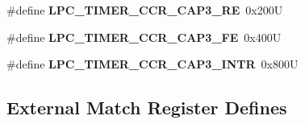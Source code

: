 \begin{DoxyCompactItemize}
\mbox{\label{group__lpc__timer_ga5c44672467e4e8e48691c2017b613d95}} 
\#define {\bfseries L\+P\+C\+\_\+\+T\+I\+M\+E\+R\+\_\+\+C\+C\+R\+\_\+\+C\+A\+P3\+\_\+\+RE}~0x200U
\item 
\mbox{\label{group__lpc__timer_ga423d3ef8324f9d53a71dc5e876f376bc}} 
\#define {\bfseries L\+P\+C\+\_\+\+T\+I\+M\+E\+R\+\_\+\+C\+C\+R\+\_\+\+C\+A\+P3\+\_\+\+FE}~0x400U
\item 
\mbox{\label{group__lpc__timer_gac62942359065b56040e7db59220d0e86}} 
\#define {\bfseries L\+P\+C\+\_\+\+T\+I\+M\+E\+R\+\_\+\+C\+C\+R\+\_\+\+C\+A\+P3\+\_\+\+I\+N\+TR}~0x800U
\end{DoxyCompactItemize}
\subsection*{External Match Register Defines}
